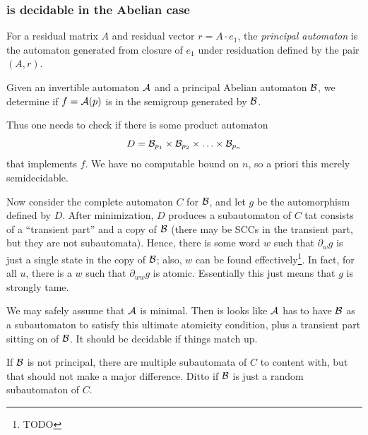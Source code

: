 \documentclass[11pt, titlepage]{article}
\begin{document}
\begin{example}
\begin{center}
\end{center}
\end{example}

\subsubsection{ is decidable in the Abelian case}

\begin{definition}
  For a residual matrix $A$ and residual vector $r = A \cdot e_1$, the
  \emph{principal automaton} is the automaton generated from closure
  of $e_1$ under residuation defined by the pair $(A, r)$.
\end{definition}

{\color{TODO}
Given an invertible automaton $\mathcal{A}$ and a principal Abelian automaton
$\mathcal{B}$, we determine if $f = \mathcal{A}(p)$ is in the semigroup generated by $\mathcal{B}$.

Thus one needs to check if there is some product automaton
\[
  D = \mathcal{B}_{p_1} \times \mathcal{B}_{p_2} \times \ldots \times \mathcal{B}_{p_n}
\]
that implements $f$. We have no computable bound on $n$, so a priori
this merely semidecidable.

Now consider the complete automaton $C$ for $\mathcal{B}$, and let $g$ be the
automorphism defined by $D$. After minimization, $D$ produces a
subautomaton of $C$ tat consists of a ``transient part'' and a copy of
$\mathcal{B}$ (there may be SCCs in the transient part, but they are not
subautomata). Hence, there is some word $w$ such that $\partial_w g$
is just a single state in the copy of $\mathcal{B}$; also, $w$ can be found
effectively\footnote{TODO}. In fact, for all $u$, there is a $w$ such
that $\partial_{ww}g$ is atomic. Essentially this just means that $g$
is strongly tame.

We may safely assume that $\mathcal{A}$ is minimal. Then is looks like $\mathcal{A}$ has
to have $\mathcal{B}$ as a subautomaton to satisfy this ultimate atomicity
condition, plus a transient part sitting on of $\mathcal{B}$. It should be
decidable if things match up.

If $\mathcal{B}$ is not principal, there are multiple subautomata of $C$ to
content with, but that should not make a major difference. Ditto if
$\mathcal{B}$ is just a random subautomaton of $C$.

%
}
\end{document}

